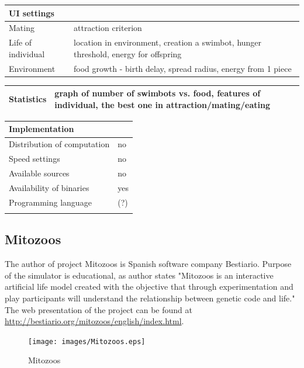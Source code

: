\documentclass[a4paper,12pt]{report}
\begin{document}
\vspace{10pt}
\begin{tabular}{|p{150pt}|p{220pt}|} \hline \textbf{UI settings}&\\ \hline
Mating&attraction criterion\\ \hline
Life of individual&location in environment, creation a swimbot, hunger threshold, energy for offspring\\ \hline
Environment&food growth - birth delay, spread radius, energy from 1 piece\\ \hline
\end{tabular} 

\vspace{10pt}
\begin{tabular}{|p{150pt}|p{220pt}|} \hline \textbf{Statistics}&graph of number of swimbots vs. food, features of individual, the best one in attraction/mating/eating\\ \hline
\end{tabular} 

\vspace{10pt}
\begin{tabular}{|p{150pt}|p{220pt}|} \hline \textbf{Implementation}&\\ \hline
Distribution of computation&no\\ \hline
Speed settings&no\\ \hline
Available sources&no\\ \hline
Availability of binaries&yes\\ \hline
Programming language&(?)\\ \hline
&\\ \hline


\end{tabular}

\subsection {Mitozoos}
The author of project Mitozoos is Spanish software company Bestiario. Purpose of the simulator is educational, as author states "Mitozoos is an interactive artificial life model created with the objective that through experimentation and play participants will understand the relationship between genetic code and life." The web presentation of the project can be found at \url{http://bestiario.org/mitozoos/english/index.html}.

\begin{figure}
\begin{center}
  \texttt{[image: images/Mitozoos.eps]}
  \caption{Mitozoos}
  \label{img.Mitozoos}
\end{center}
\end{figure}
\end{document}
